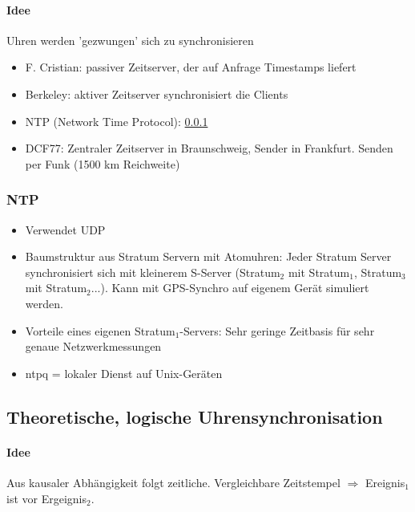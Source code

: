 \documentclass{scrartcl}
\begin{document}
\paragraph{Idee} Uhren werden 'gezwungen' sich zu synchronisieren
\begin{itemize}
\item F. Cristian: passiver Zeitserver, der auf Anfrage Timestamps liefert
\item Berkeley: aktiver Zeitserver synchronisiert die Clients
\item NTP (Network Time Protocol): \ref{ntp}
\item DCF77: Zentraler Zeitserver in Braunschweig, Sender in Frankfurt. Senden per Funk (1500 km Reichweite)
\end{itemize}



\subsubsection{NTP} \label{ntp}

\begin{itemize}
\item Verwendet UDP
\item Baumstruktur aus Stratum Servern mit Atomuhren: Jeder Stratum Server synchronisiert sich mit kleinerem S-Server (Stratum$_2$ mit Stratum$_1$, Stratum$_3$ mit Stratum$_2$...). Kann mit GPS-Synchro auf eigenem Gerät simuliert werden.
\item Vorteile eines eigenen Stratum$_1$-Servers: Sehr geringe Zeitbasis für sehr genaue Netzwerkmessungen
\item ntpq = lokaler Dienst auf Unix-Geräten
\end{itemize}




\subsection{Theoretische, logische Uhrensynchronisation}

\paragraph{Idee} Aus kausaler Abhängigkeit folgt zeitliche. Vergleichbare Zeitstempel $\Rightarrow$ Ereignis$_1$ ist vor Ergeignis$_2$. 
\end{document}
